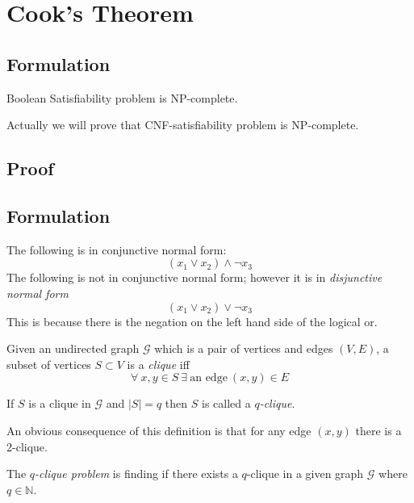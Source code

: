 \section{Cook’s Theorem}

\subsection{Formulation}
\begin{theorem}
    Boolean Satisfiability problem is NP-complete.
\end{theorem}
Actually we will prove that CNF-satisfiability problem is NP-complete.

\subsection{Proof}
\subsection{Formulation}

The following is in conjunctive normal form:
$$(x_1 \lor x_2) \land \neg x_3$$
The following is not in conjunctive normal form;
however it is in \textit{disjunctive normal form}
$$(x_1 \lor x_2) \lor \neg x_3$$
This is because there is the negation on the left hand side of the logical or.

\begin{definition}
    Given an undirected graph $\mathcal{G}$ which is a pair of vertices and edges $(V,E)$,
    a subset of vertices $S \subset V$ is a \textit{clique} iff
    $$\forall\ x, y \in S\ \exists\ \textrm{an edge}\ (x,y) \in E$$
\end{definition}

\begin{definition}
    If $S$ is a clique in $\mathcal{G}$ and $|S| = q$ then $S$ is called a \textit{$q$-clique}.
\end{definition}

An obvious consequence of this definition is that for any edge $(x,y)$ there is a 2-clique.

\begin{definition}
    The \textit{$q$-clique problem} is finding if there exists a $q$-clique in a given graph
    $\mathcal{G}$ where $q \in \mathbb{N}$.
\end{definition}
